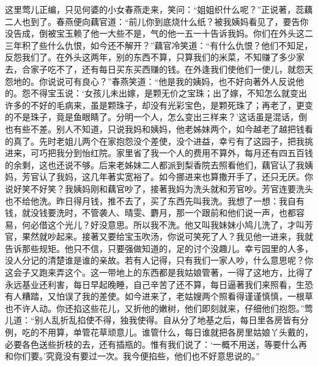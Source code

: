 \begin{parag}


    这里莺儿正编，只见何婆的小女春燕走来，笑问：“姐姐织什么呢？”正说著，蕊藕二人也到了。春燕便向藕官道：“前儿你到底烧什么纸？被我姨妈看见了，要告你没告成，倒被宝玉赖了他一大些不是，气的他一五一十告诉我妈。你们在外头这二三年积了些什么仇恨，如今还不解开？”藕官冷笑道：“有什么仇恨？他们不知足，反怨我们了。在外头这两年，别的东西不算，只算我们的米菜，不知赚了多少家去，合家子吃不了，还有每日买东买西赚的钱。在外逢我们使他们一使儿，就怨天怨地的。你说说可有良心？”春燕笑道：“他是我的姨妈，也不好向著外人反说他的。怨不得宝玉说：‘女孩儿未出嫁，是颗无价之宝珠；出了嫁，不知怎么就变出许多的不好的毛病来，虽是颗珠子，却没有光彩宝色，是颗死珠了；再老了，更变的不是珠子，竟是鱼眼睛了。分明一个人，怎么变出三样来？’这话虽是混话，倒也有些不差。别人不知道，只说我妈和姨妈，他老姊妹两个，如今越老了越把钱看的真了。先时老姐儿两个在家抱怨没个差使，没个进益，幸亏有了这园子，把我挑进来，可巧把我分到怡红院。家里省了我一个人的费用不算外，每月还有四五百钱的余剩，这也还说不够。后来老姊妹二人都派到梨香院去照看他们，藕官认了我姨妈，芳官认了我妈，这几年著实宽裕了。如今挪进来也算撒开手了，还只无厌。你说好笑不好笑？我姨妈刚和藕官吵了，接著我妈为洗头就和芳官吵。芳官连要洗头也不给他洗。昨日得月钱，推不去了，买了东西先叫我洗。我想了一想：我自有钱，就没钱要洗时，不管袭人、晴雯、麝月，那一个跟前和他们说一声，也都容易，何必借这个光儿？好没意思。所以我不洗。他又叫我妹妹小鸠儿洗了，才叫芳官，果然就吵起来。接著又要给宝玉吹汤，你说可笑死了人？我见他一进来，我就告诉那些规矩。他只不信，只要强做知道的，足的讨个没趣儿。幸亏园里的人多，没人分记的清楚谁是谁的亲故。若有人记得，只有我们一家人吵，什么意思呢？你这会子又跑来弄这个。这一带地上的东西都是我姑娘管著，一得了这地方，比得了永远基业还利害，每日早起晚睡，自己辛苦了还不算，每日逼著我们来照看，生恐有人糟踏，又怕误了我的差使。如今进来了，老姑嫂两个照看得谨谨慎慎，一根草也不许人动。你还掐这些花儿，又折他的嫩树，他们即刻就来，仔细他们抱怨。”莺儿道：“别人乱折乱掐使不得，独我使得。自从分了地基之后，每日里各房皆有分例，吃的不用算，单管花草顽意儿。谁管什么，每日谁就把各房里姑娘丫头戴的，必要各色送些折枝的去，还有插瓶的。惟有我们说了：‘一概不用送，等要什么再和你们要。’究竟没有要过一次。我今便掐些，他们也不好意思说的。”
\end{parag}


